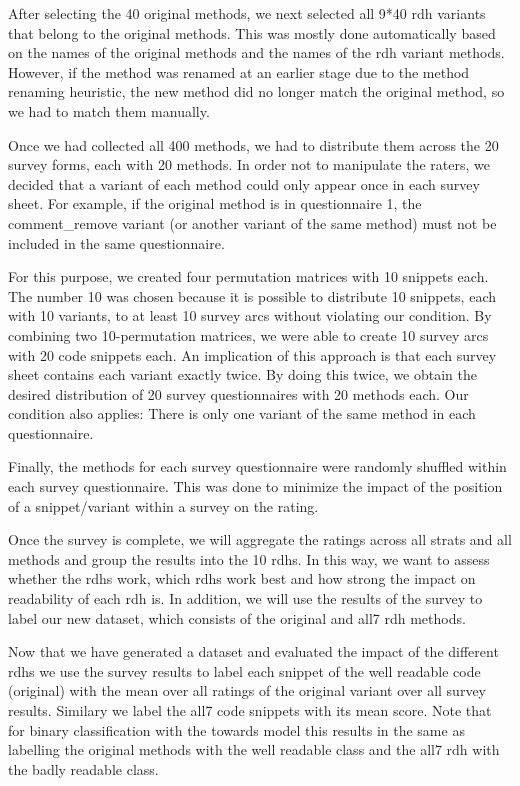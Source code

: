 \documentclass[%
class=scrreprt,
chapterprefix=false,%
open=right,%
twoside=false,%
paper=a4,%
logofile={Logo\_zentral\_farbig\_EN.png},%
thesistype=master,%
UKenglish,%
]{se2thesis}
\theoremstyle{definition}
\begin{document}
	After selecting the 40 original methods, we next selected all 9*40 rdh variants that belong to the original methods. This was mostly done automatically based on the names of the original methods and the names of the rdh variant methods. However, if the method was renamed at an earlier stage due to the method renaming heuristic, the new method did no longer match the original method, so we had to match them manually.
		
	Once we had collected all 400 methods, we had to distribute them across the 20 survey forms, each with 20 methods. In order not to manipulate the raters, we decided that a variant of each method could only appear once in each survey sheet. For example, if the original method is in questionnaire 1, the comment\_remove variant (or another variant of the same method) must not be included in the same questionnaire.
		
	For this purpose, we created four permutation matrices with 10 snippets each. The number 10 was chosen because it is possible to distribute 10 snippets, each with 10 variants, to at least 10 survey arcs without violating our condition. By combining two 10-permutation matrices, we were able to create 10 survey arcs with 20 code snippets each. An implication of this approach is that each survey sheet contains each variant exactly twice. By doing this twice, we obtain the desired distribution of 20 survey questionnaires with 20 methods each. Our condition also applies: There is only one variant of the same method in each questionnaire.
		
	Finally, the methods for each survey questionnaire were randomly shuffled within each survey questionnaire. This was done to minimize the impact of the position of a snippet/variant within a survey on the rating.
	
	Once the survey is complete, we will aggregate the ratings across all strats and all methods and group the results into the 10 rdhs. In this way, we want to assess whether the rdhs work, which rdhs work best and how strong the impact on readability of each rdh is. In addition, we will use the results of the survey to label our new dataset, which consists of the original and all7 rdh methods.
	
	Now that we have generated a dataset and evaluated the impact of the different rdhs we use the survey results to label each snippet of the well readable code (original) with the mean over all ratings of the original variant over all survey results. Similary we label the all7 code snippets with its mean score. Note that for binary classification with the towards model this results in the same as labelling the original methods with the well readable class and the all7 rdh with the badly readable class.		
	
\end{document}
